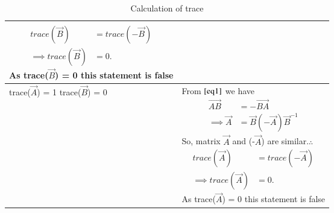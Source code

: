 \documentclass[journal,12pt,twocolumn]{IEEEtran}
\begin{document}
\begin{table}[h!]
\begin{center}
\begin{tabular}{|m{2.2cm}|m{6.3cm}|}
{\begin{align*}
            trace(\vec{B}) &= trace(-\vec{B})\\
            \implies trace(\vec{B}) &= 0.
            \end{align*}} As trace($\vec{B}$) = 0 this statement is false\\
        \hline
        trace($\vec{A}$) = 1 trace($\vec{B}$) = 0 & From $\eqref{eq1}$ we have {\begin{align*}
            \vec{AB} &= -\vec{BA}\\
            \implies\vec{A} &= \vec{B}(-\vec{A})\vec{B}^{-1}
        \end{align*}}So, matrix $\vec{A}$ and (-$\vec{A}$) are similar.$\therefore$ {\begin{align*}
            trace(\vec{A}) &= trace(-\vec{A})\\
            \implies trace(\vec{A}) &= 0.
            \end{align*}} As trace($\vec{A}$) = 0 this statement is false\\
        \hline
        
    \end{tabular}
    \end{center}
    \caption{Calculation of trace}
    \label{tab:my_label}
\end{table}
\end{document}
